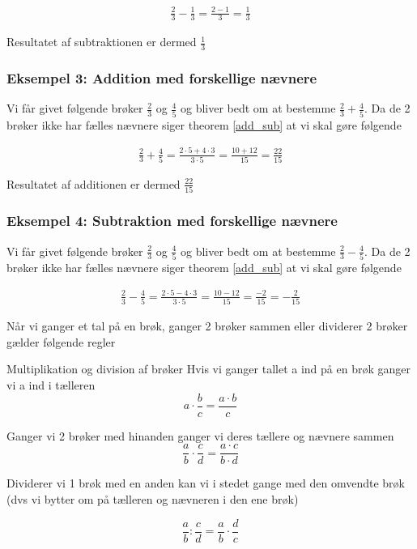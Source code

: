 \begin{align*}
\frac{2}{3} - \frac{1}{3} = \frac{2 - 1}{3} = \frac{1}{3}
\end{align*}

Resultatet af subtraktionen er dermed $\frac{1}{3}$

\subsubsection*{Eksempel 3: Addition med forskellige nævnere}

Vi får givet følgende brøker $\frac{2}{3}$ og $\frac{4}{5}$ og bliver bedt om at bestemme $\frac{2}{3} + \frac{4}{5}$. Da de 2 brøker ikke har fælles nævnere siger theorem \ref{add_sub} at vi skal gøre følgende

\begin{align*}
\frac{2}{3} + \frac{4}{5} = \frac{2\cdot 5 + 4\cdot 3}{3\cdot 5} = \frac{10 + 12}{15} = \frac{22}{15}
\end{align*}

Resultatet af additionen er dermed $\frac{22}{15}$

\subsubsection*{Eksempel 4: Subtraktion med forskellige nævnere}

Vi får givet følgende brøker $\frac{2}{3}$ og $\frac{4}{5}$ og bliver bedt om at bestemme $\frac{2}{3} - \frac{4}{5}$. Da de 2 brøker ikke har fælles nævnere siger theorem \ref{add_sub} at vi skal gøre følgende

\begin{align*}
\frac{2}{3} - \frac{4}{5} = \frac{2\cdot 5 - 4\cdot 3}{3\cdot 5} = \frac{10 - 12}{15} = \frac{-2}{15} = -\frac{2}{15}
\end{align*}


Når vi ganger et tal på en brøk, ganger 2 brøker sammen eller dividerer 2 brøker gælder følgende regler

\begin{frm-thm}{Multiplikation og division af brøker}
Hvis vi ganger tallet a ind på en brøk ganger vi a ind i tælleren
\[a\cdot \frac{b}{c} = \frac{a\cdot b}{c}\]

Ganger vi 2 brøker med hinanden ganger vi deres tællere og nævnere sammen
\[\frac{a}{b} \cdot \frac{c}{d} = \frac{a\cdot c}{b\cdot d} \]

Dividerer vi 1 brøk med en anden kan vi i stedet gange med den omvendte brøk (dvs vi bytter om på tælleren og nævneren i den ene brøk)

\[\frac{a}{b} : \frac{c}{d} = \frac{a}{b} \cdot \frac{d}{c}\]
\end{frm-thm}

